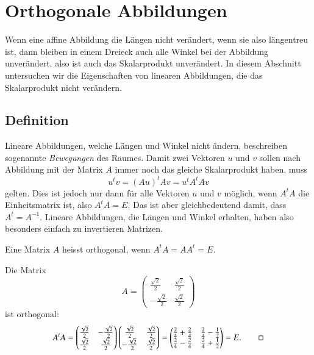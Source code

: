 %
%
%
\section{Orthogonale Abbildungen\label{section:orthabb}}
Wenn eine affine Abbildung die Längen nicht verändert, wenn sie also
längentreu ist, dann bleiben in einem Dreieck auch alle Winkel bei
der Abbildung unverändert, also ist auch das Skalarprodukt unverändert.
In diesem Abschnitt untersuchen wir die Eigenschaften von linearen
Abbildungen, die das Skalarprodukt nicht verändern.

\subsection{Definition}
Lineare Abbildungen, welche Längen und Winkel nicht ändern, beschreiben
sogenannte {\em Bewegungen} des Raumes.
Damit zwei Vektoren $u$ und $v$ sollen nach Abbildung
mit der Matrix $A$ immer noch das gleiche Skalarprodukt haben, muss
\[
u^tv=(Au)^tAv=u^tA^tAv
\]
gelten.
Dies ist jedoch nur dann für alle Vektoren $u$ und $v$ möglich,
wenn $A^tA$ die Einheitsmatrix ist, also $A^tA=E$.
Das ist aber gleichbedeutend damit, dass $A^t=A^{-1}$.
Lineare Abbildungen, die Längen und
Winkel erhalten, haben also besonders einfach zu invertieren Matrizen.

\begin{definition}
Eine Matrix $A$ heisst orthogonal, wenn $A^tA=AA^t=E$.
\end{definition}

\begin{beispiel}
Die Matrix 
\[
A=
\begin{pmatrix}
\frac{\sqrt{2}}2& \frac{\sqrt{2}}2\\
-\frac{\sqrt{2}}2& \frac{\sqrt{2}}2
\end{pmatrix}
\]
ist orthogonal:
\[
A^tA=
\begin{pmatrix}
\frac{\sqrt{2}}2&-\frac{\sqrt{2}}2\\
\frac{\sqrt{2}}2& \frac{\sqrt{2}}2
\end{pmatrix}
\begin{pmatrix}
\frac{\sqrt{2}}2& \frac{\sqrt{2}}2\\
-\frac{\sqrt{2}}2& \frac{\sqrt{2}}2
\end{pmatrix}
=
\begin{pmatrix}
\frac24+\frac24&\frac24-\frac12\\
\frac24-\frac24&\frac24+\frac12
\end{pmatrix}
=E.
\qedhere
\]
\end{beispiel}

